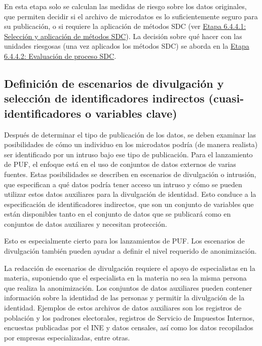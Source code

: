 \documentclass[
]{book}
\theoremstyle{definition}
\theoremstyle{definition}
\theoremstyle{definition}
\theoremstyle{definition}
\theoremstyle{remark}
\begin{document}
En esta etapa solo se calculan las medidas de riesgo sobre los datos originales, que permiten decidir si el archivo de microdatos es lo suficientemente seguro para su publicación, o si requiere la aplicación de métodos SDC (ver \protect\hyperlink{etapa-6.4.4.1-selecciuxf3n-y-aplicaciuxf3n-de-muxe9todos-sdc}{Etapa 6.4.4.1: Selección y aplicación de métodos SDC}). La decisión sobre qué hacer con las unidades riesgosas (una vez aplicados los métodos SDC) se aborda en la \protect\hyperlink{etapa-6.4.4.2-evaluaciuxf3n-de-proceso-sdc}{Etapa 6.4.4.2: Evaluación de proceso SDC}.

\hypertarget{definiciuxf3n-de-escenarios-de-divulgaciuxf3n-y-selecciuxf3n-de-identificadores-indirectos-cuasi-identificadores-o-variables-clave}{%
\subsection{Definición de escenarios de divulgación y selección de identificadores indirectos (cuasi-identificadores o variables clave)}\label{definiciuxf3n-de-escenarios-de-divulgaciuxf3n-y-selecciuxf3n-de-identificadores-indirectos-cuasi-identificadores-o-variables-clave}}

Después de determinar el tipo de publicación de los datos, se deben examinar las posibilidades de cómo un individuo en los microdatos podría (de manera realista) ser identificado por un intruso bajo ese tipo de publicación. Para el lanzamiento de PUF, el enfoque está en el uso de conjuntos de datos externos de varias fuentes. Estas posibilidades se describen en escenarios de divulgación o intrusión, que especifican a qué datos podría tener acceso un intruso y cómo se pueden utilizar estos datos auxiliares para la divulgación de identidad. Esto conduce a la especificación de identificadores indirectos, que son un conjunto de variables que están disponibles tanto en el conjunto de datos que se publicará como en conjuntos de datos auxiliares y necesitan protección.

Esto es especialmente cierto para los lanzamientos de PUF. Los escenarios de divulgación también pueden ayudar a definir el nivel requerido de anonimización.

La redacción de escenarios de divulgación requiere el apoyo de especialistas en la materia, suponiendo que el especialista en la materia no sea la misma persona que realiza la anonimización. Los conjuntos de datos auxiliares pueden contener información sobre la identidad de las personas y permitir la divulgación de la identidad. Ejemplos de estos archivos de datos auxiliares son los registros de población y los padrones electorales, registros de Servicio de Impuestos Internos, encuestas publicadas por el INE y datos censales, así como los datos recopilados por empresas especializadas, entre otras.
\end{document}
